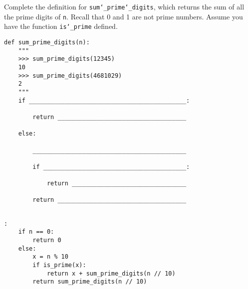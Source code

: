\begin{blocksection}
\question Complete the definition for \texttt{sum\char`_prime\char`_digits}, which returns the sum of all the prime digits of \texttt{n}. Recall that 0 and 1 are not prime numbers. Assume you have the function \texttt{is\char`_prime} defined. \\

\begin{lstlisting}
def sum_prime_digits(n):
    """
    >>> sum_prime_digits(12345)
    10
    >>> sum_prime_digits(4681029)
    2
    """
    if ____________________________________________:		

        return ____________________________________	

    else:

        ___________________________________________			

        if ________________________________________:		

            return ________________________________				

        return ____________________________________
				
\end{lstlisting}

\begin{solution}[1in]
\begin{lstlisting}:
    if n == 0:
        return 0
    else:
        x = n % 10
        if is_prime(x):
            return x + sum_prime_digits(n // 10)
        return sum_prime_digits(n // 10)
\end{lstlisting}
\end{solution}
\end{blocksection}
